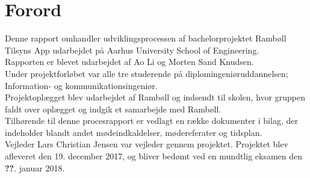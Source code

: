\chapter*{Forord}
Denne rapport omhandler udviklingsprocessen af bachelorprojektet Rambøll Tilsyns App udarbejdet på Aarhus University School of Engineering. \\
Rapporten er blevet udarbejdet af Ao Li og Morten Sand Knudsen. \\ 
Under projektforløbet var alle tre studerende på diplomingeniøruddannelsen; Information- og kommunikationsingeniør. \\
Projektoplægget blev udarbejdet af Rambøll og indsendt til skolen, hvor gruppen faldt over oplægget og indgik et samarbejde med Rambøll. \\
Tilhørende til denne procesrapport er vedlagt en række dokumenter i bilag, der indeholder blandt andet mødeindkaldelser,
mødereferater og tidsplan. \\

Vejleder Lars Christian Jensen var vejleder gennem projektet. Projektet blev afleveret den 19.
december 2017, og bliver bedømt ved en mundtlig eksamen den \textbf{??}. januar 2018.